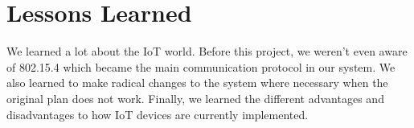 \chapter{Lessons Learned}

We learned a lot about the IoT world. Before this project, we weren’t even aware of 802.15.4 which became the main communication protocol in our system. We also learned to make radical changes to the system where necessary when the original plan does not work. Finally, we learned the different advantages and disadvantages to how IoT devices are currently implemented.